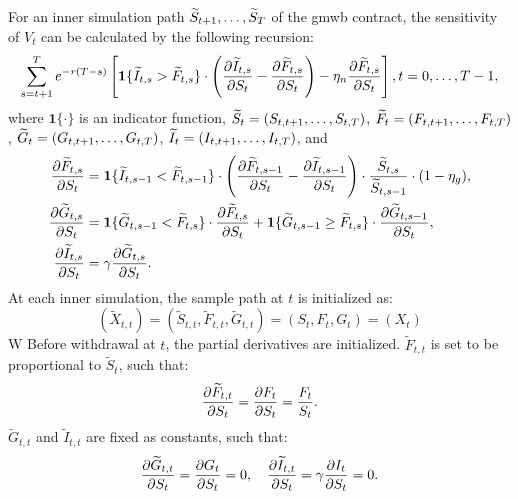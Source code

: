 For an inner simulation path $\widetilde{S}_{t+1},\ldots,\widetilde{S}_{T}$ of the \gls{gmwb} contract, the sensitivity of $V_t$ can be calculated by the following recursion:
\begin{equation}
    \sum_{s=t+1}^{T} e^{-r(T-s)} \left[\bm{1}\{\widetilde{I}_{t,s} > \widetilde{F}_{t,s}\} \cdot \left( \frac{\partial \widetilde{I}_{t,s}}{ \partial S_t} - \frac{\partial \widetilde{F}_{t,s}}{ \partial S_t}\right)- \eta_n \frac{\partial \widetilde{F}_{t,s}}{ \partial S_t}\right], \nonumber \\
    t=0,\ldots,T-1, 
\end{equation}
where $\bm{1}\{\cdot\}$ is an indicator function, $\widetilde{S}_t = (S_{t, t+1},\ldots,S_{t, T})$, $\widetilde{F}_t = (F_{t, t+1},\ldots,F_{t, T})$, $\widetilde{G}_t = (G_{t, t+1},\ldots,G_{t, T})$, $\widetilde{I}_t = (I_{t, t+1},\ldots,I_{t, T})$, and
\begin{align} \label{eq2:partial-derivatives}
    \frac{\partial \widetilde{F}_{t, s}}{ \partial S_t} &= \bm{1}\{\widetilde{I}_{t, s-1} < \widetilde{F}_{t, s-1}\}\cdot\left( \frac{\partial \widetilde{F}_{t, s-1}}{ \partial S_t} - \frac{\partial \widetilde{I}_{t, s-1}}{ \partial S_t}\right) \cdot \frac{\widetilde{S}_{t, s}}{\widetilde{S}_{t, s-1}}\cdot (1-\eta_g),\nonumber \\
    \frac{\partial \widetilde{G}_{t, s}}{ \partial S_t} &= \bm{1}\{\widetilde{G}_{t, s-1} < \widetilde{F}_{t, s}\}\cdot\frac{\partial \widetilde{F}_{t, s}}{ \partial S_t} + \bm{1}\{\widetilde{G}_{t, s-1} \geq \widetilde{F}_{t, s}\}\cdot\frac{\partial \widetilde{G}_{t, s-1}}{ \partial S_t},\nonumber \\
    \frac{\partial \widetilde{I}_{t, s}}{ \partial S_t} &= \gamma \frac{\partial \widetilde{G}_{t, s}}{ \partial S_t}.
\end{align}
At each inner simulation, the sample path at $t$ is initialized as:
\begin{equation}
    (\tilde{X}_{t, t}) = (\tilde{S}_{t, t}, \tilde{F}_{t, t}, \tilde{G}_{t, t}) = (S_t, F_t, G_t) = (X_t)
\end{equation}
W
Before withdrawal at $t$, the partial derivatives are initialized. $\tilde{F}_{t, t}$ is set to be proportional to $\tilde{S}_{t}$, such that:
\begin{equation}
    \frac{\partial \widetilde{F}_{t, t}}{ \partial S_t} = \frac{\partial F_t}{ \partial S_t} = \frac{F_t}{S_t}.
\end{equation}
$\tilde{G}_{t, t}$ and $\tilde{I}_{t, t}$ are fixed as constants, such that:
\begin{equation}
    \frac{\partial \widetilde{G}_{t, t}}{ \partial S_t} = \frac{\partial G_{t}}{ \partial S_t} = 0, \quad \frac{\partial \widetilde{I}_{t, t}}{ \partial S_t} = \gamma \frac{\partial I_{t}}{ \partial S_t} = 0.
\end{equation}

